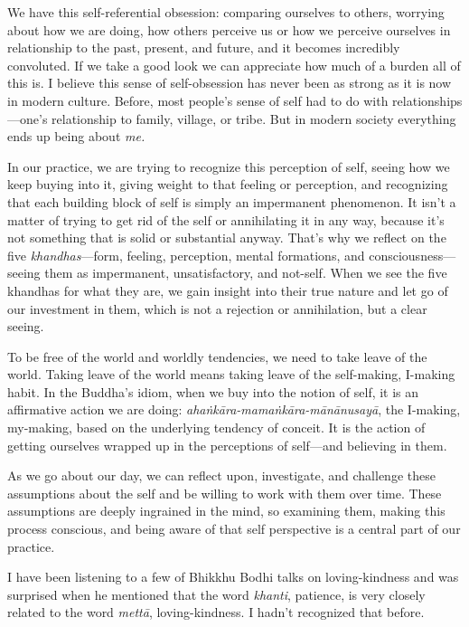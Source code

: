 We have this self-referential obsession: comparing ourselves to others, 
worrying about how we are doing, how others perceive us or how we 
perceive ourselves in relationship to the past, present, and future, 
and it becomes incredibly convoluted. If we take a good look we can 
appreciate how much of a burden all of this is. I believe this sense of 
self-obsession has never been as strong as it is now in modern culture. 
Before, most people's sense of self had to do with 
relationships---one's relationship to family, village, or tribe. But in 
modern society everything ends up being about \emph{me.}

In our practice, we are trying to recognize this perception of self, 
seeing how we keep buying into it, giving weight to that feeling or 
perception, and recognizing that each building block of self is simply 
an impermanent phenomenon. It isn't a matter of trying to get rid of 
the self or annihilating it in any way, because it's not something that 
is solid or substantial anyway. That's why we reflect on the five 
\emph{khandhas}---form, feeling, perception, mental formations, and 
consciousness---seeing them as impermanent, unsatisfactory, and 
not-self. When we see the five khandhas for what they are, we gain 
insight into their true nature and let go of our investment in them, 
which is not a rejection or annihilation, but a clear seeing.

To be free of the world and worldly tendencies, we need to take leave 
of the world. Taking leave of the world means taking leave of the 
self-making, I-making habit. In the Buddha's idiom, when we buy into 
the notion of self, it is an affirmative action we are doing: 
\emph{ahaṅkāra-mamaṅkāra-mānānusayā}, the I-making, my-making, 
based on the underlying tendency of conceit. It is the action of 
getting ourselves wrapped up in the perceptions of self---and believing 
in them.

As we go about our day, we can reflect upon, investigate, and challenge 
these assumptions about the self and be willing to work with them over 
time. These assumptions are deeply ingrained in the mind, so examining 
them, making this process conscious, and being aware of that self 
perspective is a central part of our practice.


I have been listening to a few of Bhikkhu Bodhi talks on 
loving-kindness and was surprised when he mentioned that the word 
\emph{khanti}, patience, is very closely related to the word 
\emph{mettā}, loving-kindness. I hadn't recognized that before.

